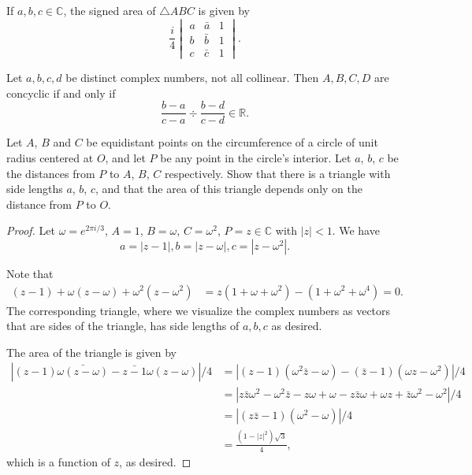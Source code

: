 \documentclass[11pt]{article}
\newcommand{\R}{\mathbb{R}}
\newcommand{\C}{\mathbb C}
\renewcommand{\>}{\rangle}
\newcommand{\<}{\langle}
\begin{document}
\begin{theorem} If $a, b, c \in \C$, the signed area of $\triangle ABC$ is given by 
$$\frac{i}{4}\begin{vmatrix}
a &\bar{a}  &1 \\ 
 b&\bar b  &1 \\ 
 c&\bar c  &1 
\end{vmatrix}.$$
\end{theorem}
\begin{theorem} Let $a, b, c, d$ be distinct complex numbers, not all collinear.  Then $A, B, C, D$ are concyclic if and only if 
$$\frac{b-a}{c-a} \div \frac{b-d}{c-d} \in \R.$$

\end{theorem}
\begin{problem}[Putnam 2003/B5]Let $A$, $B$ and $C$ be equidistant points on the circumference of a circle of unit radius centered at $O$, and let $P$ be any point in the circle's interior. Let $a$, $b$, $c$ be the distances from $P$ to $A$, $B$, $C$ respectively. Show that there is a triangle with side lengths $a$, $b$, $c$, and that the area of this triangle depends only on the distance from $P$ to $O$.
\end{problem}

\begin{proof}
Let $\omega = e^{2\pi i / 3}$, $A = 1$, $B = \omega$, $C = \omega^2$, $P = z \in \C$ with $|z| < 1$.  We have 
$$a = |z - 1|, b = |z - \omega|,  c = |z - \omega^2|.$$

Note that 
\begin{align*}
(z - 1) + \omega(z - \omega) + \omega^2(z - \omega^2) &= z(1 + \omega + \omega^2) - (1 + \omega^2 + \omega^4) = 0.
\end{align*}
The corresponding triangle, where we visualize the complex numbers as vectors that are sides of the triangle, has side lengths of $a, b, c$ as desired.  

The area of the triangle is given by 
\begin{align*}
|(z-1) \bar{\omega(z - \omega)} - \bar{z - 1} \omega(z - \omega)|/4 &= |(z - 1) (\omega^2\bar{z} - \omega) - (\bar{z} - 1) (\omega z - \omega^2)|/4 \\
&= |z \bar{z} \omega^2 - \omega^2 \bar{z} - z\omega + \omega - z\bar{z} \omega + \omega z + \bar{z} \omega^2  - \omega^2|/4 \\
&= |(z \bar{z} - 1) (\omega^2 - \omega)|/4\\
&= \frac{(1 - |z|^2)\sqrt{3}}{4},
\end{align*}
which is a function of $z$, as desired. 
\end{proof}
\end{document}
